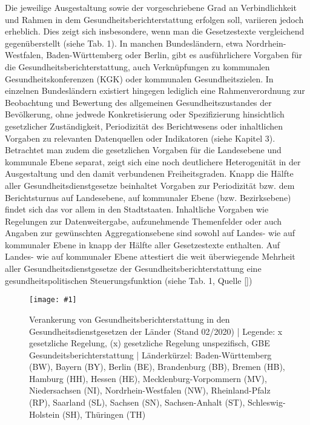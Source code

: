 \documentclass{article}
\newlength{\imgwidth}
\newcommand\scaledgraphics[2]{%
                
\settowidth{\imgwidth}{\texttt{[image: \#1]}}%
                
\setlength{\imgwidth}{\minof{\imgwidth}{#2\textwidth}}%
                
\texttt{[image: \#1]}%
                
}
\begin{document}
Die jeweilige Ausgestaltung sowie der vorgeschriebene Grad an Verbindlichkeit und Rahmen in dem Gesundheitsberichterstattung erfolgen soll, variieren jedoch erheblich. Dies zeigt sich insbesondere, wenn man die Gesetzestexte vergleichend gegenüberstellt (siehe Tab. 1). In manchen Bundesländern, etwa Nordrhein-Westfalen, Baden-Württemberg oder Berlin, gibt es ausführlichere Vorgaben für die Gesundheitsberichterstattung, auch Verknüpfungen zu kommunalen Gesundheitskonferenzen (KGK) oder kommunalen Gesundheitszielen. In einzelnen Bundesländern existiert hingegen lediglich eine Rahmenverordnung zur Beobachtung und Bewertung des allgemeinen Gesundheitszustandes der Bevölkerung, ohne jedwede Konkretisierung oder Spezifizierung hinsichtlich gesetzlicher Zuständigkeit, Periodizität des Berichtwesens oder inhaltlichen Vorgaben zu relevanten Datenquellen oder Indikatoren (siehe Kapitel 3). Betrachtet man zudem die gesetzlichen Vorgaben für die Landesebene und kommunale Ebene separat, zeigt sich eine noch deutlichere Heterogenität in der Ausgestaltung und den damit verbundenen Freiheitsgraden. Knapp die Hälfte aller Gesundheitsdienstgesetze beinhaltet Vorgaben zur Periodizität bzw. dem Berichtsturnus auf Landesebene, auf kommunaler Ebene (bzw. Bezirksebene) findet sich das vor allem in den Stadtstaaten. Inhaltliche Vorgaben wie Regelungen zur Datenweitergabe, aufzunehmende Themenfelder oder auch Angaben zur gewünschten Aggregationsebene sind sowohl auf Landes- wie auf kommunaler Ebene in knapp der Hälfte aller Gesetzestexte enthalten. Auf Landes- wie auf kommunaler Ebene attestiert die weit überwiegende Mehrheit aller Gesundheitsdienstgesetze der Gesundheitsberichterstattung eine gesundheitspolitischen Steuerungsfunktion (siehe Tab. 1, Quelle [\autocite{RosenkötterNicoleundweitere2020}])

\begin{figure}
\scaledgraphics{d9babbfb-61d4-4e18-abe4-76e891ab59e5.jpg}{1}
\caption*{Verankerung von Gesundheitsberichterstattung in den Gesundheitsdienstgesetzen der Länder (Stand 02/2020) | Legende: x gesetzliche Regelung, (x) gesetzliche Regelung unspezifisch, GBE Gesundeitsberichterstattung | Länderkürzel: Baden-Württemberg (BW), Bayern (BY), Berlin (BE), Brandenburg (BB), Bremen (HB), Hamburg (HH), Hessen (HE), Mecklenburg-Vorpommern (MV), Niedersachsen (NI), Nordrhein-Westfalen (NW), Rheinland-Pfalz (RP), Saarland (SL), Sachsen (SN), Sachsen-Anhalt (ST), Schleswig-Holstein (SH), Thüringen (TH)}\label{F7030531}
\end{figure}
\end{document}
